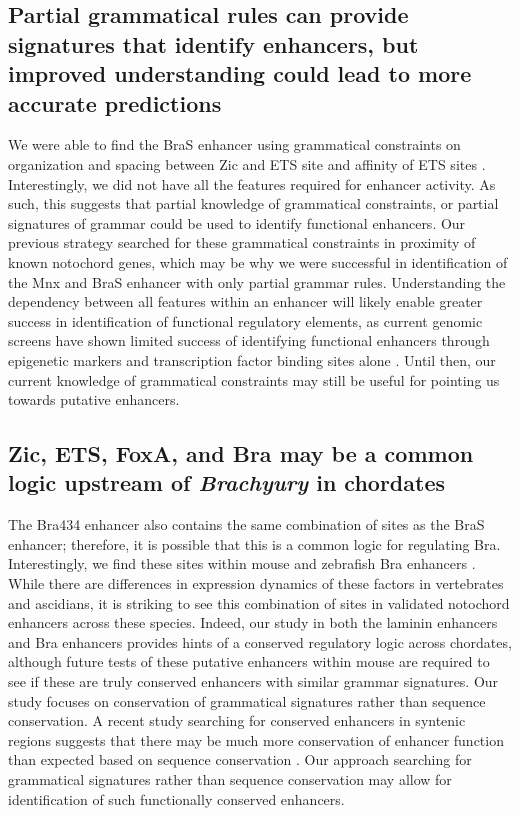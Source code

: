 \subsection{Partial grammatical rules can provide signatures that identify enhancers, but improved understanding could lead to more accurate predictions}

We were able to find the BraS enhancer using grammatical constraints on organization and spacing between Zic and ETS site and affinity of ETS sites \cite{farley2016}. Interestingly, we did not have all the features required for enhancer activity. As such, this suggests that partial knowledge of grammatical constraints, or partial signatures of grammar could be used to identify functional enhancers. Our previous strategy searched for these grammatical constraints in proximity of known notochord genes, which may be why we were successful in identification of the Mnx and BraS enhancer with only partial grammar rules. Understanding the dependency between all features within an enhancer will likely enable greater success in identification of functional regulatory elements, as current genomic screens have shown limited success of identifying functional enhancers through epigenetic markers and transcription factor binding sites alone \cite{king2020a}. Until then, our current knowledge of grammatical constraints may still be useful for pointing us towards putative enhancers. 

\subsection{Zic, ETS, FoxA, and Bra may be a common logic upstream of \textit{Brachyury} in chordates}

The Bra434 enhancer also contains the same combination of sites as the BraS enhancer; therefore, it is possible that this is a common logic for regulating Bra. Interestingly, we find these sites within mouse and zebrafish Bra enhancers \cite{harvey2010,schifferl2021}. While there are differences in expression dynamics of these factors in vertebrates and ascidians, it is striking to see this combination of sites in validated notochord enhancers across these species. Indeed, our study in both the laminin enhancers and Bra enhancers provides hints of a conserved regulatory logic across chordates, although future tests of these putative enhancers within mouse are required to see if these are truly conserved enhancers with similar grammar signatures. Our study focuses on conservation of grammatical signatures rather than sequence conservation. A recent study searching for conserved enhancers in syntenic regions suggests that there may be much more conservation of enhancer function than expected based on sequence conservation \cite{wong2020}. Our approach searching for grammatical signatures rather than sequence conservation may allow for identification of such functionally conserved enhancers.

